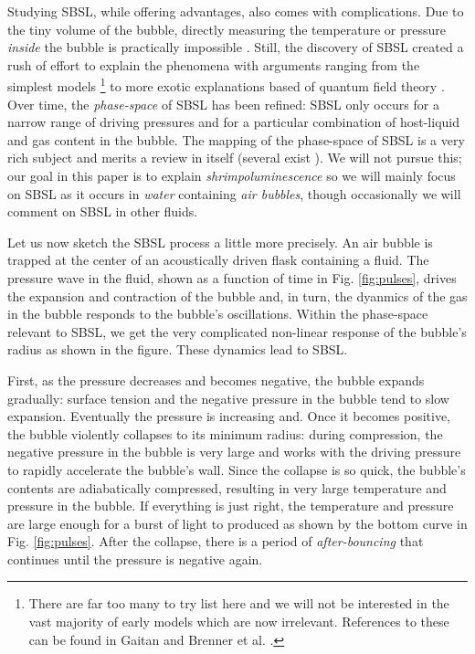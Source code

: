\documentclass[rmp,aps,nofootinbib,superscriptaddress,floatfix]{revtex4-2}
\begin{document}
Studying SBSL, while offering advantages, also comes with complications. Due to the tiny volume of the bubble, directly measuring the temperature or pressure \emph{inside} the bubble is practically impossible \cite{suslick2008inside}. Still, the discovery of SBSL created a rush of effort to explain the phenomena with arguments ranging from the simplest models \footnote{There are far too many to try list here and we will not be interested in the vast majority of early models which are now irrelevant. References to these can be found in Gaitan \cite{gaitan1990experimental} and Brenner et al. \cite{brenner2002single}.} to more exotic explanations based of quantum field theory \cite{schwinger1993casimir,eberlein1996sonoluminescence,liberati2000sonoluminescence}. Over time, the \emph{phase-space} of SBSL has been refined: SBSL only occurs for a narrow range of driving pressures and for a particular combination of host-liquid and gas content in the bubble. The mapping of the phase-space of SBSL is a very rich subject and merits a review in itself (several exist \cite{brenner2002single,yasui2018acoustic}). We will not pursue this; our goal in this paper is to explain \emph{shrimpoluminescence} so we will mainly focus on SBSL as it occurs in \emph{water} containing \emph{air bubbles}, though occasionally we will comment on SBSL in other fluids. 

Let us now sketch the SBSL process a little more precisely. An air bubble is trapped at the center of an acoustically driven flask containing a fluid. The pressure wave in the fluid, shown as a function of time in Fig. \ref{fig:pulses}, drives the expansion and contraction of the bubble and, in turn, the dyanmics of the gas in the bubble responds to the bubble's oscillations. Within the phase-space relevant to SBSL, we get the very complicated non-linear response of the bubble's radius as shown in the figure. These dynamics lead to SBSL.

First, as the pressure decreases and becomes negative, the bubble expands gradually: surface tension and the negative pressure in the bubble tend to slow expansion. Eventually the pressure is increasing and. Once it becomes positive, the bubble violently collapses to its minimum radius: during compression, the negative pressure in the bubble is very large and works with the driving pressure to rapidly accelerate the bubble's wall. Since the collapse is so quick, the bubble's contents are adiabatically compressed, resulting in very large temperature and pressure in the bubble. If everything is just right, the temperature and pressure are large enough for a burst of light to produced as shown by the bottom curve in Fig. \ref{fig:pulses}. After the collapse, there is a period of \emph{after-bouncing} that continues until the pressure is negative again. 
\end{document}
